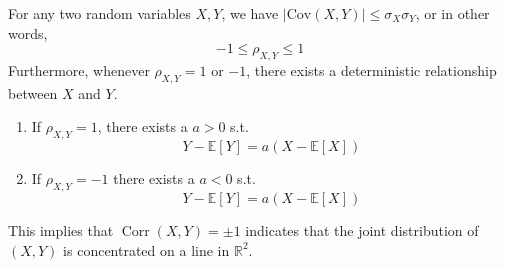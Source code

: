 \documentclass{article}
\DeclareMathOperator{\Corr}{Corr}
\begin{document}
      \begin{theorem}
        For any two random variables $X, Y$, we have $|\mathrm{Cov}(X, Y)| \leq \sigma_X \sigma_Y$, or in other words, 
        \begin{equation}
          -1 \leq \rho_{X, Y} \leq 1
        \end{equation}
        Furthermore, whenever $\rho_{X, Y} = 1$ or $-1$, there exists a deterministic relationship between $X$ and $Y$. 
        \begin{enumerate}
          \item If $\rho_{X, Y} = 1$, there exists a $a > 0$ s.t. 
          \begin{equation}
            Y - \mathbb{E}[Y] = a (X - \mathbb{E}[X])
          \end{equation}
          \item If $\rho_{X, Y} = -1$ there exists a $a < 0$ s.t. 
          \begin{equation}
            Y - \mathbb{E}[Y] = a (X - \mathbb{E}[X])
          \end{equation}
        \end{enumerate}
        This implies that $\Corr(X, Y) = \pm 1$ indicates that the joint distribution of $(X, Y)$ is concentrated on a line in $\mathbb{R}^2$. 
      \end{theorem}
\end{document}

